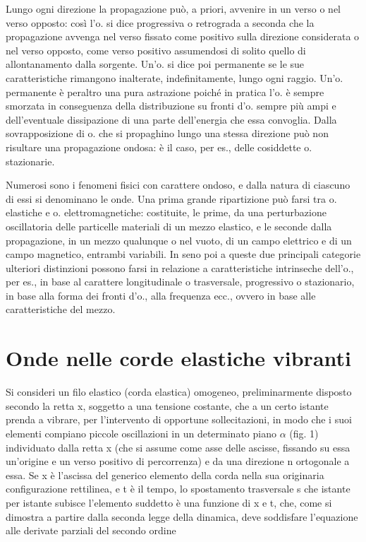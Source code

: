 \documentclass[a4paper]{article}
\begin{document}
Lungo ogni direzione la propagazione può, a priori, avvenire in un verso o nel verso opposto: così l'o. si dice progressiva o retrograda a seconda che la propagazione avvenga nel verso fissato come positivo sulla direzione considerata o nel verso opposto, come verso positivo assumendosi di solito quello di allontanamento dalla sorgente. Un'o. si dice poi permanente se le sue caratteristiche rimangono inalterate, indefinitamente, lungo ogni raggio. Un'o. permanente è peraltro una pura astrazione poiché in pratica l'o. è sempre smorzata in conseguenza della distribuzione su fronti d'o. sempre più ampi e dell'eventuale dissipazione di una parte dell'energia che essa convoglia. Dalla sovrapposizione di o. che si propaghino lungo una stessa direzione può non risultare una propagazione ondosa: è il caso, per es., delle cosiddette o. stazionarie. 

Numerosi sono i fenomeni fisici con carattere ondoso, e dalla natura di ciascuno di essi si denominano le onde. Una prima grande ripartizione può farsi tra o. elastiche e o. elettromagnetiche: costituite, le prime, da una perturbazione oscillatoria delle particelle materiali di un mezzo elastico, e le seconde dalla propagazione, in un mezzo qualunque o nel vuoto, di un campo elettrico e di un campo magnetico, entrambi variabili. In seno poi a queste due principali categorie ulteriori distinzioni possono farsi in relazione a caratteristiche intrinseche dell'o., per es., in base al carattere longitudinale o trasversale, progressivo o stazionario, in base alla forma dei fronti d'o., alla frequenza ecc., ovvero in base alle caratteristiche del mezzo. 

\section{Onde nelle corde elastiche vibranti}
Si consideri un filo elastico (corda elastica) omogeneo, preliminarmente disposto secondo la retta x, soggetto a una tensione costante, che a un certo istante prenda a vibrare, per l'intervento di opportune sollecitazioni, in modo che i suoi elementi compiano piccole oscillazioni in un determinato piano $\alpha$ (fig. 1) individuato dalla retta x (che si assume come asse delle ascisse, fissando su essa un'origine e un verso positivo di percorrenza) e da una direzione n ortogonale a essa. Se x è l'ascissa del generico elemento della corda nella sua originaria configurazione rettilinea, e t è il tempo, lo spostamento trasversale s che istante per istante subisce l'elemento suddetto è una funzione di x e t, che, come si dimostra a partire dalla seconda legge della dinamica, deve soddisfare l'equazione alle derivate parziali del secondo ordine
\end{document}
